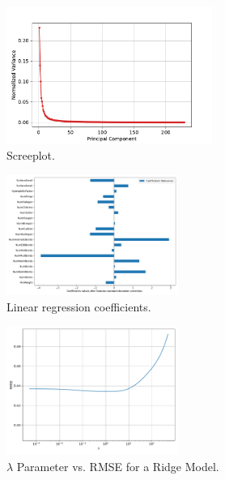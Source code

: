 

\begin{figure}[htbp!]
  \centerline{\includegraphics[width=0.6\textwidth]{../../code/hw2/figures/0-PCA-screeplot.pdf}}
  \caption{Screeplot.}
  \label{fig:0-PCA-screeplot}
\end{figure}

\begin{figure}[htbp!]
  \centerline{\includegraphics[width=0.5\textwidth]{../../code/hw2/figures/2-linear-regression-coefficients.pdf}}
  \caption{Linear regression coefficients.}
  \label{fig:2-linear-regression-coefficients}
\end{figure}

\begin{figure}[htbp!]
  \centerline{\includegraphics[width=0.5\textwidth]{../../code/hw2/figures/3-lambda-ridge.pdf}}
  \caption{$\lambda$ Parameter vs. RMSE for a Ridge Model.}
  \label{fig:3-lambda-ridge}
\end{figure}

